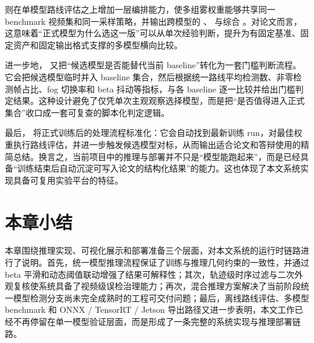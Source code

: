  则在单模型路线评估之上增加一层编排能力，使多组雾权重能够共享同一 benchmark 视频集和同一采样策略，并输出跨模型的 、 与综合 。对论文而言，这意味着“正式模型为什么选这一版”可以从单次经验判断，提升为有固定基准、固定资产和固定输出格式支撑的多模型横向比较。

进一步地， 又把“候选模型是否能替代当前 baseline”转化为一套门槛判断流程。它会把候选模型临时并入 baseline 集合，然后根据统一路线平均检测数、非零检测帧占比、fog 切换率和 beta 抖动等指标，与各 baseline 逐一比较并给出门槛判定结果。这种设计避免了仅凭单次主观观察选择模型，而是把“是否值得进入正式集合”收口成一套可复查的脚本化判定逻辑。

最后， 将正式训练后的处理流程标准化：它会自动找到最新训练 run，对最佳权重执行路线评估，并进一步触发候选模型对标，从而输出适合论文和答辩使用的精简总结。换言之，当前项目中的推理与部署并不只是“模型能跑起来”，而是已经具备“训练结束后自动沉淀可写入论文的结构化结果”的能力。这也体现了本文系统实现具备可复用实验平台的特征。

\section{本章小结}

本章围绕推理实现、可视化展示和部署准备三个层面，对本文系统的运行时链路进行了说明。首先，统一模型推理流程保证了训练与推理几何约束的一致性，并通过 beta 平滑和动态阈值联动增强了结果可解释性；其次，轨迹级时序过滤与二次外观复核使系统具备了视频级误检治理能力；再次，混合推理方案解决了当前阶段统一模型检测分支尚未完全成熟时的工程可交付问题；最后，离线路线评估、多模型 benchmark 和 ONNX / TensorRT / Jetson 导出路径又进一步表明，本文工作已经不再停留在单一模型验证层面，而是形成了一条完整的系统实现与推理部署链路。
